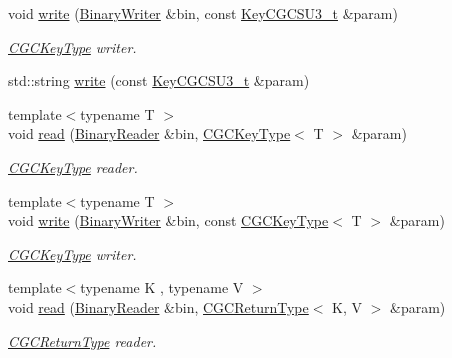 \begin{DoxyCompactItemize}
void \mbox{\hyperlink{namespaceHadron_af206eaa349ec42352cb0a106dfd89c5b}{write}} (\mbox{\hyperlink{classADATIO_1_1BinaryWriter}{Binary\+Writer}} \&bin, const \mbox{\hyperlink{structHadron_1_1KeyCGCSU3__t}{Key\+C\+G\+C\+S\+U3\+\_\+t}} \&param)
\begin{DoxyCompactList}\small\item\em \mbox{\hyperlink{structHadron_1_1CGCKeyType}{C\+G\+C\+Key\+Type}} writer. \end{DoxyCompactList}\item 
std\+::string \mbox{\hyperlink{namespaceHadron_a4af69bc389ee44d25d1f3efa30042e4c}{write}} (const \mbox{\hyperlink{structHadron_1_1KeyCGCSU3__t}{Key\+C\+G\+C\+S\+U3\+\_\+t}} \&param)
\item 
{\footnotesize template$<$typename T $>$ }\\void \mbox{\hyperlink{namespaceHadron_af29a7ca56e3472207899938a2a50babe}{read}} (\mbox{\hyperlink{classADATIO_1_1BinaryReader}{Binary\+Reader}} \&bin, \mbox{\hyperlink{structHadron_1_1CGCKeyType}{C\+G\+C\+Key\+Type}}$<$ T $>$ \&param)
\begin{DoxyCompactList}\small\item\em \mbox{\hyperlink{structHadron_1_1CGCKeyType}{C\+G\+C\+Key\+Type}} reader. \end{DoxyCompactList}\item 
{\footnotesize template$<$typename T $>$ }\\void \mbox{\hyperlink{namespaceHadron_aa23076bfdc2f1ebd99330197de102a6d}{write}} (\mbox{\hyperlink{classADATIO_1_1BinaryWriter}{Binary\+Writer}} \&bin, const \mbox{\hyperlink{structHadron_1_1CGCKeyType}{C\+G\+C\+Key\+Type}}$<$ T $>$ \&param)
\begin{DoxyCompactList}\small\item\em \mbox{\hyperlink{structHadron_1_1CGCKeyType}{C\+G\+C\+Key\+Type}} writer. \end{DoxyCompactList}\item 
{\footnotesize template$<$typename K , typename V $>$ }\\void \mbox{\hyperlink{namespaceHadron_a28b215f1b16c66c9862495bf8c11084f}{read}} (\mbox{\hyperlink{classADATIO_1_1BinaryReader}{Binary\+Reader}} \&bin, \mbox{\hyperlink{structHadron_1_1CGCReturnType}{C\+G\+C\+Return\+Type}}$<$ K, V $>$ \&param)
\begin{DoxyCompactList}\small\item\em \mbox{\hyperlink{structHadron_1_1CGCReturnType}{C\+G\+C\+Return\+Type}} reader. \end{DoxyCompactList}\item 

\end{DoxyCompactItemize}
